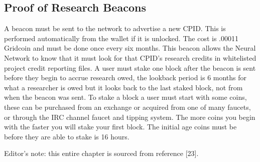\subsection{Proof of Research Beacons}

A beacon must be sent to the network to advertise a new CPID. This is performed automatically from the wallet if it is unlocked. The cost is .00011 Gridcoin and must be done once every six months. This beacon allows the Neural Network to know that it must look for that CPID's research credits in whitelisted project credit reporting files. A user must stake one block after the beacon is sent before they begin to accrue research owed, the lookback period is 6 months for what a researcher is owed but it looks back to the last staked block, not from when the beacon was sent. To stake a block a user must start with some coins, these can be purchased from an exchange or acquired from one of many faucets, or through the IRC channel faucet and tipping system. The more coins you begin with the faster you will stake your first block.  The initial age coins must be before they are able to stake is 16 hours.

Editor's note: this entire chapter is sourced from reference [23].\\
